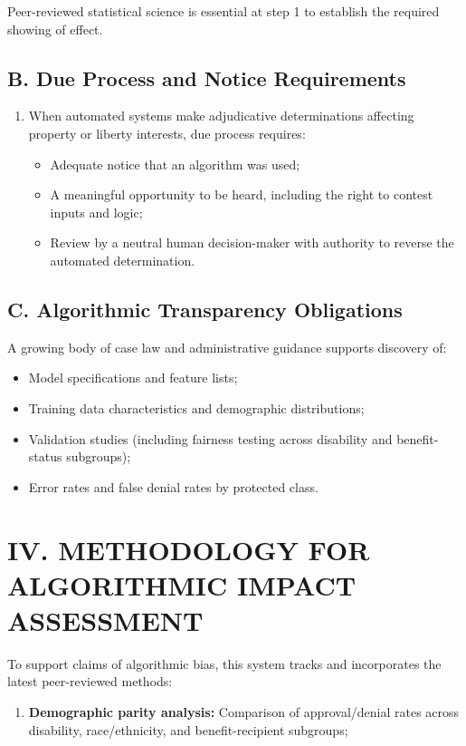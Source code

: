 \documentclass[12pt,letterpaper]{article}
\begin{document}
\begin{singlespacing}
Peer-reviewed statistical science is essential at step 1 to establish the required showing of effect.

\subsection*{B. Due Process and Notice Requirements}

\begin{enumerate}
    \item When automated systems make adjudicative determinations affecting property or liberty interests, due process requires:
    \begin{itemize}
        \item Adequate notice that an algorithm was used;
        \item A meaningful opportunity to be heard, including the right to contest inputs and logic;
        \item Review by a neutral human decision-maker with authority to reverse the automated determination.
    \end{itemize}
\end{enumerate}

\subsection*{C. Algorithmic Transparency Obligations}

A growing body of case law and administrative guidance supports discovery of:
\begin{itemize}
    \item Model specifications and feature lists;
    \item Training data characteristics and demographic distributions;
    \item Validation studies (including fairness testing across disability and benefit-status subgroups);
    \item Error rates and false denial rates by protected class.
\end{itemize}

\section*{IV. METHODOLOGY FOR ALGORITHMIC IMPACT ASSESSMENT}

To support claims of algorithmic bias, this system tracks and incorporates the latest peer-reviewed methods:

\begin{enumerate}
    \item \textbf{Demographic parity analysis:} Comparison of approval/denial rates across disability, race/ethnicity, and benefit-recipient subgroups;


\end{enumerate}
\end{singlespacing}
\end{document}

